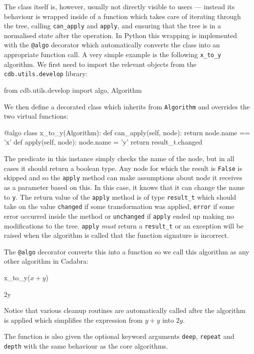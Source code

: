\documentclass{article}
\begin{document}
The class itself is, however, usually not directly visible to users --- instead its behaviour is wrapped inside of a function
which takes care of iterating through the tree, calling \verb|can_apply| and \verb|apply|, and ensuring that the tree is in
a normalised state after the operation. In Python this wrapping is implemented with the \verb|@algo| decorator which
automatically converts the class into an appropriate function call. A very simple example is the following \verb|x_to_y|
algorithm. We first need to import the relevant objects from the \verb|cdb.utils.develop| library:  
\begin{lstcdb}
	from cdb.utils.develop import algo, Algorithm
\end{lstcdb} 
We then define a decorated class which inherits from \verb|Algorithm| and overrides the two virtual functions:
\begin{lstcdb}
	@algo
	class x_to_y(Algorithm):
		def can_apply(self, node):
			return node.name == 'x'
		def apply(self, node):
			node.name = 'y'
			return result_t.changed
\end{lstcdb}
The predicate in this instance simply checks the name of the node, but in all cases it should return a boolean type. Any node
for which the result is \verb|False| is skipped and so the \verb|apply| method can make assumptions about node it receives as
a parameter based on this. In this case, it knows that it can change the name to \texttt{y}. The return value of the 
\verb|apply| method is of type \verb|result_t| which should take on the value \texttt{changed} if some transformation was
applied, \texttt{error} if some error occurred inside the method or \texttt{unchanged} if \verb|apply| ended up making no
modifications to the tree. \verb|apply| \emph{must} return a \verb|result_t| or an exception will be raised when the algorithm
is called that the function signature is incorrect.

The \verb|@algo| decorator converts this into a function so we call this algorithm as any other algorithm in Cadabra:
\begin{lstcdb}
	x_to_y($x + y$)
\end{lstcdb}
\begin{lstverb}
	2y
\end{lstverb}
Notice that various cleanup routines are automatically called after the algorithm is applied which simplifies the expression
from $y + y$ into $2y$. 

The function is also given the optional keyword arguments \verb|deep|, \verb|repeat| and \verb|depth| with the same behaviour
as the core algorithms.
\end{document}

